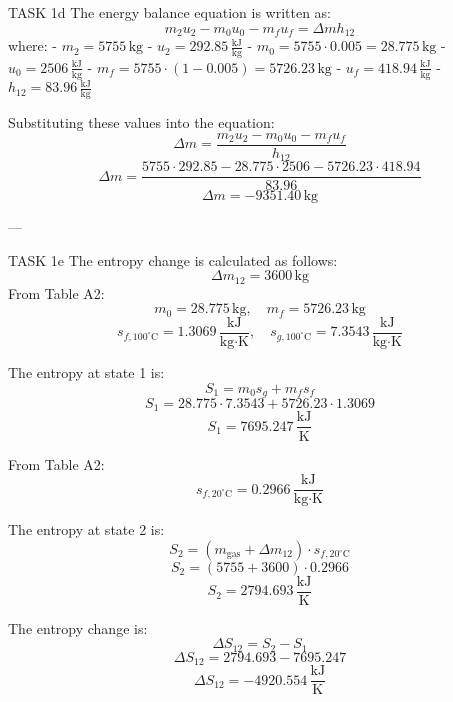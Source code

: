 TASK 1d  
The energy balance equation is written as:  
\[
m_2 u_2 - m_0 u_0 - m_f u_f = \Delta m h_{12}
\]  
where:  
- \( m_2 = 5755 \, \text{kg} \)  
- \( u_2 = 292.85 \, \frac{\text{kJ}}{\text{kg}} \)  
- \( m_0 = 5755 \cdot 0.005 = 28.775 \, \text{kg} \)  
- \( u_0 = 2506 \, \frac{\text{kJ}}{\text{kg}} \)  
- \( m_f = 5755 \cdot (1 - 0.005) = 5726.23 \, \text{kg} \)  
- \( u_f = 418.94 \, \frac{\text{kJ}}{\text{kg}} \)  
- \( h_{12} = 83.96 \, \frac{\text{kJ}}{\text{kg}} \)  

Substituting these values into the equation:  
\[
\Delta m = \frac{m_2 u_2 - m_0 u_0 - m_f u_f}{h_{12}}
\]  
\[
\Delta m = \frac{5755 \cdot 292.85 - 28.775 \cdot 2506 - 5726.23 \cdot 418.94}{83.96}
\]  
\[
\Delta m = -9351.40 \, \text{kg}
\]  

---

TASK 1e  
The entropy change is calculated as follows:  
\[
\Delta m_{12} = 3600 \, \text{kg}
\]  
From Table A2:  
\[
m_0 = 28.775 \, \text{kg}, \quad m_f = 5726.23 \, \text{kg}
\]  
\[
s_{f,100^\circ\text{C}} = 1.3069 \, \frac{\text{kJ}}{\text{kg·K}}, \quad s_{g,100^\circ\text{C}} = 7.3543 \, \frac{\text{kJ}}{\text{kg·K}}
\]  

The entropy at state 1 is:  
\[
S_1 = m_0 s_g + m_f s_f
\]  
\[
S_1 = 28.775 \cdot 7.3543 + 5726.23 \cdot 1.3069
\]  
\[
S_1 = 7695.247 \, \frac{\text{kJ}}{\text{K}}
\]  

From Table A2:  
\[
s_{f,20^\circ\text{C}} = 0.2966 \, \frac{\text{kJ}}{\text{kg·K}}
\]  

The entropy at state 2 is:  
\[
S_2 = (m_{\text{gas}} + \Delta m_{12}) \cdot s_{f,20^\circ\text{C}}
\]  
\[
S_2 = (5755 + 3600) \cdot 0.2966
\]  
\[
S_2 = 2794.693 \, \frac{\text{kJ}}{\text{K}}
\]  

The entropy change is:  
\[
\Delta S_{12} = S_2 - S_1
\]  
\[
\Delta S_{12} = 2794.693 - 7695.247
\]  
\[
\Delta S_{12} = -4920.554 \, \frac{\text{kJ}}{\text{K}}
\]